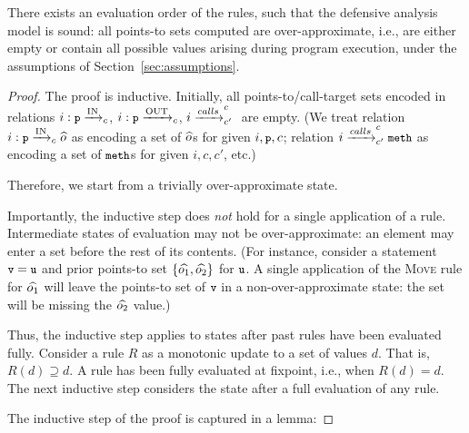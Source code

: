 
\begin{theorem}
There exists an evaluation order of the rules, such that the defensive
analysis model is sound: all points-to sets computed are
over-approximate, i.e., are either empty or contain all possible
values arising during program execution, under the assumptions of
Section~\ref{sec:assumptions}.
\begin{proof}

  The proof is inductive. Initially, all points-to/call-target sets
  encoded in relations \({{i}: {{\small {\texttt{p}}}} \xrightarrow{\text{IN}}_{c} }\), \({{i}: {{\small {\texttt{p}}}} \xrightarrow{\text{OUT}}_{c} }\),
  \({i} \xrightarrow{calls}^{c}_{c'} {}\) are empty. (We treat relation \({{i}: {{\small {\texttt{p}}}} \xrightarrow{\text{IN}}_{c} {\widehat{o}}}\)
  as encoding a set of \({\widehat{o}}\)s for given \(i,{\small {\texttt{p}}},c\); relation
  \({i} \xrightarrow{calls}^{c}_{c'} {{\small {\texttt{meth}}}}\) as encoding a set of \({\small {\texttt{meth}}}\)s for
  given \(i,c,c'\), etc.)

  Therefore, we start from a trivially over-approximate state.

  Importantly, the inductive step does \emph{not} hold for a single
  application of a rule. Intermediate states of evaluation may not be
  over-approximate: an element may enter a set before the rest of its
  contents. (For instance, consider a statement
  \(\moveinstr{\var{v}}{\var{u}}\) and prior points-to set 
  \(\{{\widehat{o_1}},{\widehat{o_2}}\}\) for \({\small {\texttt{u}}}\). A single application
  of the \textsc{Move} rule for \({\widehat{o_1}}\) will leave the
  points-to set of \({\small {\texttt{v}}}\) in a non-over-approximate state:
  the set will be missing the \({\widehat{o_2}}\) value.)

  Thus, the inductive step applies to states after 
  past rules have been evaluated fully. Consider a rule $R$ as a
  monotonic update to a set of values $d$. That is,
  $R(d) \supseteq d$. A rule has been fully evaluated at fixpoint,
  i.e., when $R(d) = d$. The next inductive step considers the
  state after a full evaluation of any rule.

  The inductive step of the proof is captured in a lemma:


\end{proof}
\end{theorem}
